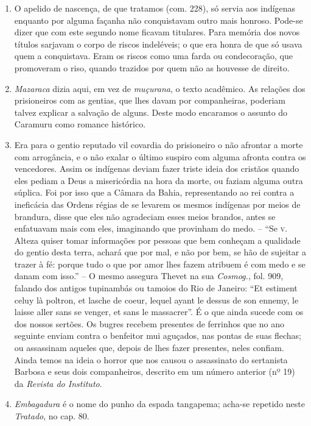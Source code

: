 \begin{enumerate}
\item O apelido de nascença, de que tratamos (com. 228), só servia aos indígenas 
enquanto por alguma façanha não conquistavam outro mais honroso. Pode-se dizer que 
com este segundo nome ficavam titulares. Para memória dos novos títulos sarjavam o 
corpo de riscos indeléveis; o que era honra de que só usava quem a conquistava. Eram 
os riscos como uma farda ou condecoração, que promoveram o riso, quando trazidos 
por quem não as houvesse de direito.

\item \textit{Mazaraca} dizia aqui, em vez de \textit{muçurana}, o texto acadêmico. As relações dos 
prisioneiros com as gentias, que lhes davam por companheiras, poderiam talvez 
explicar a salvação de alguns. Deste modo encaramos o assunto do Caramuru como 
romance histórico.

\item Era para o gentio reputado vil covardia do prisioneiro o não afrontar a morte com 
arrogância, e o não exalar o último suspiro com alguma afronta contra os vencedores. 
Assim os indígenas deviam fazer triste ideia dos cristãos quando eles pediam a Deus a 
misericórdia na hora da morte, ou faziam alguma outra súplica. Foi por isso que a 
Câmara da Bahia, representando ao rei contra a ineficácia das Ordens régias de se 
levarem os mesmos indígenas por meios de brandura, disse que eles não agradeciam esses meios 
brandos, antes se enfatuavam mais com eles, imaginando que provinham do medo. -- ``Se \textsc{v}. 
Alteza quiser tomar informações por pessoas que bem conheçam a qualidade do gentio desta 
terra, achará que por mal, e não por bem, se hão de sujeitar a trazer à fé: porque tudo o que 
por amor lhes fazem atribuem é com medo e se danam com isso.'' -- O mesmo assegura 
Thevet na sua \textit{Cosmog.}, fol. 909, falando dos antigos tupinambás ou tamoios do Rio de 
Janeiro: ``Et estiment celuy là poltron, et lasche de coeur, lequel ayant le dessus de son 
ennemy, le laisse aller sans se venger, et sans le massacrer''.  É o que ainda sucede com os 
dos nossos sertões. Os bugres recebem presentes de ferrinhos que no ano seguinte enviam 
contra o benfeitor mui aguçados, nas pontas de suas flechas; ou assassinam aqueles que, 
depois de lhes fazer presentes, neles confiam. Ainda temos na ideia o horror que nos causou 
o assassinato do sertanista Barbosa e seus dois companheiros, descrito em um número 
anterior (nº 19) da \textit{Revista do Instituto}.

\item \textit{Embagadura} é o nome do punho da espada tangapema; acha-se repetido neste \textit{Tratado}, no cap. 80.


\end{enumerate}
